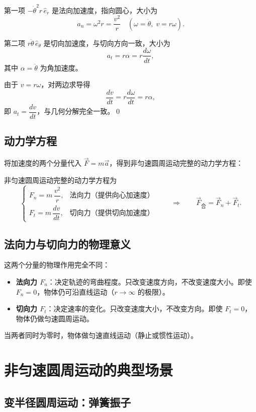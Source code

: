 \documentclass[12pt,a4paper]{article}
\begin{document}
第一项 $-\dot{\theta}^2 r\,\hat{e}_r$ 是法向加速度，指向圆心，大小为
\[
a_n = \omega^2 r = \frac{v^2}{r}\quad(\omega=\dot{\theta},\; v=r\omega).
\]

第二项 $r\ddot{\theta}\,\hat{e}_\theta$ 是切向加速度，与切向方向一致，大小为
\[
a_t = r\alpha = r\frac{d\omega}{dt},
\]
其中 $\alpha=\ddot{\theta}$ 为角加速度。

由于 $v=r\omega$，对两边求导得
\[
\frac{dv}{dt} = r\frac{d\omega}{dt} = r\alpha,
\]
即 $a_t = \dfrac{dv}{dt}$，与几何分解完全一致。\qed

\subsection{动力学方程}

将加速度的两个分量代入 $\vec{F}=m\vec{a}$，得到非匀速圆周运动完整的动力学方程：

非匀速圆周运动完整的动力学方程为
\[
\begin{cases}
F_n = m\,\dfrac{v^2}{r}, & \text{法向力（提供向心加速度）}\\[8pt]
F_t = m\,\dfrac{dv}{dt}, & \text{切向力（提供切向加速度）}
\end{cases}
\qquad\Longrightarrow\qquad
\vec{F}_{\text{合}} = \vec{F}_n + \vec{F}_t.
\]

\subsection{法向力与切向力的物理意义}

这两个分量的物理作用完全不同：

\begin{itemize}
\item \textbf{法向力 $F_n$}：决定轨迹的弯曲程度。只改变速度方向，不改变速度大小。即使 $F_n=0$，物体仍可沿直线运动（$r\to\infty$ 的极限）。
\item \textbf{切向力 $F_t$}：决定速率的变化。只改变速度大小，不改变方向。即使 $F_t=0$，物体仍做匀速圆周运动。
\end{itemize}

当两者同时为零时，物体做匀速直线运动（静止或惯性运动）。

\section{非匀速圆周运动的典型场景}

\subsection{变半径圆周运动：弹簧振子}
\end{document}
